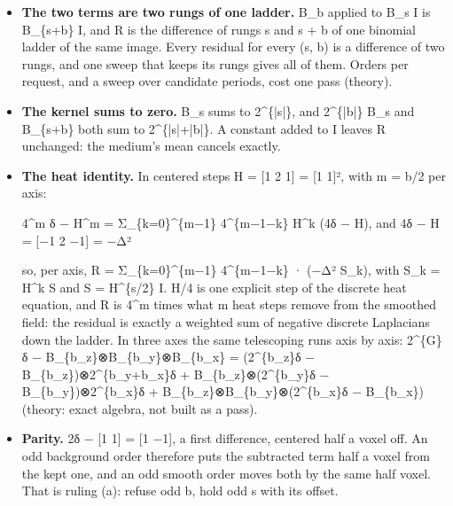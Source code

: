 \begin{itemize}
\item \textbf{The two terms are two rungs of one ladder.} B\_\allowbreak{}b applied to B\_\allowbreak{}s I is B\_\allowbreak{}\{s+b\} I, and R is the difference of rungs s and s + b of one binomial ladder of the same image. Every residual for every (s, b) is a difference of two rungs, and one sweep that keeps its rungs gives all of them. Orders per request, and a sweep over candidate periods, cost one pass (theory).
\item \textbf{The kernel sums to zero.} B\_\allowbreak{}s sums to 2\textasciicircum{}\{|s|\}, and 2\textasciicircum{}\{|b|\} B\_\allowbreak{}s and B\_\allowbreak{}\{s+b\} both sum to 2\textasciicircum{}\{|s|+|b|\}. A constant added to I leaves R unchanged: the medium's mean cancels exactly.
\item \textbf{The heat identity.} In centered steps H = [1 2 1] = [1 1]², with m = b/2 per axis:

4\textasciicircum{}m δ − H\textasciicircum{}m = Σ\_\allowbreak{}\{k=0\}\textasciicircum{}\{m−1\} 4\textasciicircum{}\{m−1−k\} H\textasciicircum{}k (4δ − H),  and 4δ − H = [−1 2 −1] = −Δ²

so, per axis, R = Σ\_\allowbreak{}\{k=0\}\textasciicircum{}\{m−1\} 4\textasciicircum{}\{m−1−k\} · (−Δ² S\_\allowbreak{}k), with S\_\allowbreak{}k = H\textasciicircum{}k S and S = H\textasciicircum{}\{s/2\} I. H/4 is one explicit step of the discrete heat equation, and R is 4\textasciicircum{}m times what m heat steps remove from the smoothed field: the residual is exactly a weighted sum of negative discrete Laplacians down the ladder. In three axes the same telescoping runs axis by axis: 2\textasciicircum{}\{G\}δ − B\_\allowbreak{}\{b\_\allowbreak{}z\}⊗B\_\allowbreak{}\{b\_\allowbreak{}y\}⊗B\_\allowbreak{}\{b\_\allowbreak{}x\} = (2\textasciicircum{}\{b\_\allowbreak{}z\}δ − B\_\allowbreak{}\{b\_\allowbreak{}z\})⊗2\textasciicircum{}\{b\_\allowbreak{}y+b\_\allowbreak{}x\}δ + B\_\allowbreak{}\{b\_\allowbreak{}z\}⊗(2\textasciicircum{}\{b\_\allowbreak{}y\}δ − B\_\allowbreak{}\{b\_\allowbreak{}y\})⊗2\textasciicircum{}\{b\_\allowbreak{}x\}δ + B\_\allowbreak{}\{b\_\allowbreak{}z\}⊗B\_\allowbreak{}\{b\_\allowbreak{}y\}⊗(2\textasciicircum{}\{b\_\allowbreak{}x\}δ − B\_\allowbreak{}\{b\_\allowbreak{}x\}) (theory: exact algebra, not built as a pass).
\item \textbf{Parity.} 2δ − [1 1] = [1 −1], a first difference, centered half a voxel off. An odd background order therefore puts the subtracted term half a voxel from the kept one, and an odd smooth order moves both by the same half voxel. That is ruling (a): refuse odd b, hold odd s with its offset.
\end{itemize}

